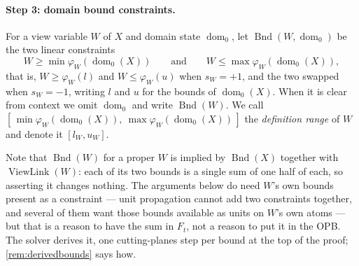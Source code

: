 \documentclass[11pt,a4paper]{article}
\theoremstyle{plain}
\theoremstyle{definition}
\theoremstyle{remark}
\newcommand{\fname}[1]{\ensuremath{\operatorname{#1}}}
\newcommand{\Bnd}{\fname{Bnd}}
\newcommand{\ViewLink}{\fname{ViewLink}}
\newcommand{\dm}{\fname{dom}}
\begin{document}
\paragraph{Step 3: domain bound constraints.}
For a view variable $W$ of $X$ and domain state $\dm_0$, let $\Bnd(W,\dm_0)$
be the two linear constraints
\begin{equation}
  W \geq \min \varphi_W(\dm_0(X)) \qquad\text{and}\qquad
  W \leq \max \varphi_W(\dm_0(X)) ,
  \label{eq:bnd}
\end{equation}
that is, $W\geq \varphi_W(l)$ and $W \leq \varphi_W(u)$ when $s_W=+1$, and the
two swapped when $s_W=-1$, writing $l$ and $u$ for the bounds of $\dm_0(X)$.
When it is clear from context we omit $\dm_0$ and write $\Bnd(W)$.  We call
$[\,\min\varphi_W(\dm_0(X)),\ \max\varphi_W(\dm_0(X))\,]$ the \emph{definition
range} of $W$ and denote it $[l_W,u_W]$.

Note that $\Bnd(W)$ for a proper $W$ is implied by $\Bnd(X)$ together with
$\ViewLink(W)$: each of its two bounds is a single sum of one half of each, so
asserting it changes nothing.  The arguments below do need $W$'s own bounds
present as a constraint --- unit propagation cannot add two constraints
together, and several of them want those bounds available as units on $W$'s own
atoms --- but that is a reason to have the sum in $F_t$, not a reason to put it
in the OPB.  The solver derives it, one cutting-planes step per bound at the top
of the proof; \cref{rem:derivedbounds} says how.
\end{document}
